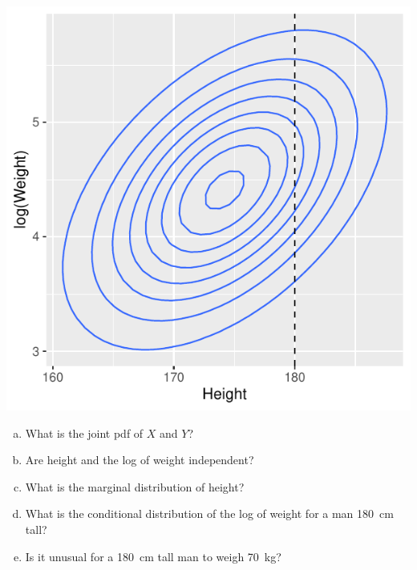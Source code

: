 \begin{frame}
  \begin{block}{\examplectd}
    \begin{center}
      \includegraphics[height=.7\textheight]{figure/example-25-3-1}
    \end{center}
  \end{block}
\end{frame}

\begin{frame}
  \begin{block}{\examplectd}
    \begin{enumerate}[a)]
      
    \item What is the joint pdf of $X$ and $Y$? 

    \item Are height and the log of weight independent?
      
    \item What is the marginal distribution of height?
      
    \item What is the conditional distribution of the log of weight for a man 180~cm tall? 
    
    \item Is it unusual for a 180~cm tall man to weigh 70~kg?
    \end{enumerate}
  \end{block}
\end{frame}

